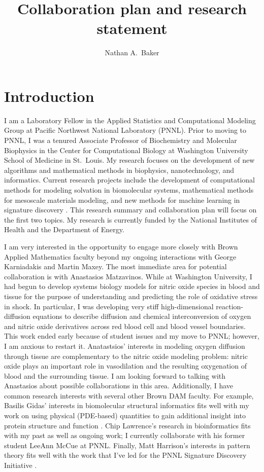 \documentclass[11pt]{amsart}
\title{Collaboration plan and research statement}
\author{Nathan A.\ Baker}
\begin{document}
\maketitle

\section{Introduction}

I am a Laboratory Fellow in the Applied Statistics and Computational Modeling Group at Pacific Northwest National Laboratory (PNNL).
Prior to moving to PNNL, I was a tenured Associate Professor of Biochemistry and Molecular Biophysics in the Center for Computational Biology at Washington University School of Medicine in St.\ Louis.
My research focuses on the development of new algorithms and mathematical methods in biophysics, nanotechnology, and informatics.
Current research projects include the development of computational methods for modeling solvation in biomolecular systems, mathematical methods for mesoscale materials modeling, and new methods for machine learning in signature discovery \cite{SDI, SDI-paper}.
This research summary and collaboration plan will focus on the first two topics.
My research is currently funded by the National Institutes of Health and the Department of Energy.

I am very interested in the opportunity to engage more closely with Brown Applied Mathematics faculty beyond my ongoing interactions with George Karniadakis and Martin Maxey.
The most immediate area for potential collaboration is with Anastasios Matzavinos.  
While at Washington University, I had begun to develop systems biology models for nitric oxide species in blood and tissue for the purpose of understanding and predicting the role of oxidative stress in shock.
In particular, I was developing very stiff high-dimensional reaction-diffusion equations to describe diffusion and chemical interconversion of oxygen and nitric oxide derivatives across red blood cell and blood vessel boundaries. 
This work ended early because of student issues and my move to PNNL; however, I am anxious to restart it.
Anatastsios' interests in modeling oxygen diffusion through tissue are complementary to the nitric oxide modeling problem:  nitric oxide plays an important role in vasodilation and the resulting oxygenation of blood and the surrounding tissue.  
I am looking forward to talking with Anastasios about possible collaborations in this area.
Additionally, I have common research interests with several other Brown DAM faculty. 
For example, Basilis Gidas' interests in biomolecular structural informatics fits well with my work on using physical (PDE-based) quantities to gain additional insight into protein structure and function \cite{Lei2014, Zhang2006}.
Chip Lawrence's research in bioinformatics fits with my past as well as ongoing work; I currently collaborate with his former student LeeAnn McCue at PNNL.
Finally, Matt Harrison's interests in pattern theory fits well with the work that I've led for the PNNL Signature Discovery Initiative \cite{SDI}.
\end{document}
